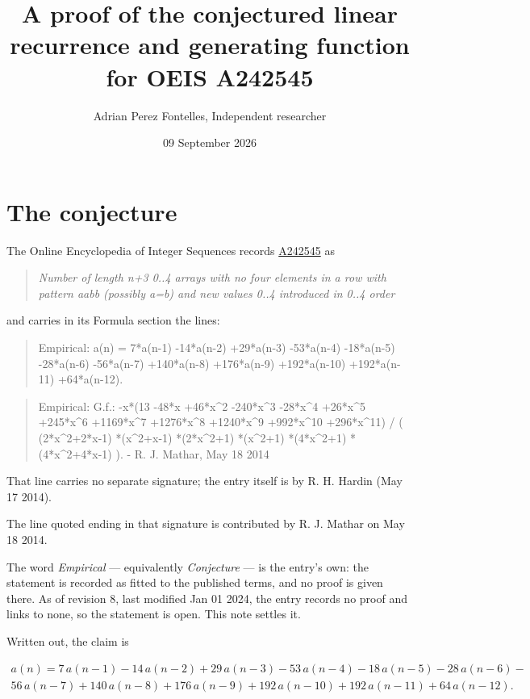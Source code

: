 \documentclass[11pt]{article}
\title{A proof of the conjectured linear recurrence and generating function for OEIS A242545}
\author{Adrian Perez Fontelles, Independent researcher}
\date{09 September 2026}
\theoremstyle{definition}
\begin{document}
\maketitle
\section{The conjecture}

The Online Encyclopedia of Integer Sequences records \href{https://oeis.org/A242545}{A242545} as

\begin{quote}\itshape Number of length n+3 0..4 arrays with no four elements in a row with pattern aabb (possibly a=b) and new values 0..4 introduced in 0..4 order\end{quote}

and carries in its Formula section the lines:

\begin{quote}\ttfamily Empirical: a(n) = 7*a(n-1) -14*a(n-2) +29*a(n-3) -53*a(n-4) -18*a(n-5) -28*a(n-6) -56*a(n-7) +140*a(n-8) +176*a(n-9) +192*a(n-10) +192*a(n-11) +64*a(n-12).\end{quote}

\begin{quote}\ttfamily Empirical: G.f.:  -x*(13 -48*x +46*x\textasciicircum{}2 -240*x\textasciicircum{}3 -28*x\textasciicircum{}4 +26*x\textasciicircum{}5 +245*x\textasciicircum{}6 +1169*x\textasciicircum{}7 +1276*x\textasciicircum{}8 +1240*x\textasciicircum{}9 +992*x\textasciicircum{}10 +296*x\textasciicircum{}11) / ( (2*x\textasciicircum{}2+2*x-1) *(x\textasciicircum{}2+x-1) *(2*x\textasciicircum{}2+1) *(x\textasciicircum{}2+1) *(4*x\textasciicircum{}2+1) *(4*x\textasciicircum{}2+4*x-1) ). - R. J. Mathar, May 18 2014\end{quote}

That line carries no separate signature; the entry itself is by R. H. Hardin (May 17 2014).

The line quoted ending in that signature is contributed by R. J. Mathar on May 18 2014.

The word {\itshape Empirical} --- equivalently {\itshape Conjecture} --- is the entry's own: the statement is recorded as fitted to the published terms, and no proof is given there. As of revision 8, last modified Jan 01 2024, the entry records no proof and links to none, so the statement is open. This note settles it.

Written out, the claim is

\begin{multline*} a(n) = 7\,a(n-1) - 14\,a(n-2) + 29\,a(n-3) - 53\,a(n-4) - 18\,a(n-5) - 28\,a(n-6) - \\ 56\,a(n-7) + 140\,a(n-8) + 176\,a(n-9) + 192\,a(n-10) + 192\,a(n-11) + 64\,a(n-12). \end{multline*}
\end{document}
